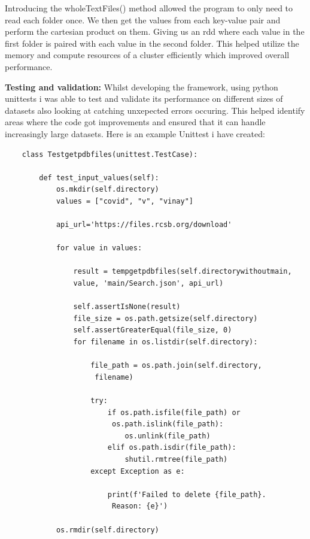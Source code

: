 \documentclass[]{final_report}
\begin{document}
Introducing the wholeTextFiles() method allowed the program to only need to read each folder once. We then get the values from each key-value pair and perform the cartesian product on them. Giving us an rdd where each value in the first folder is paired with each value in the second folder. This helped utilize the memory and compute resources of a cluster efficiently which improved overall performance.

\clearpage

\textbf{Testing and validation:} Whilst developing the framework, using python unittests i was able to test and validate its performance on different sizes of datasets also looking at catching unxepected errors occuring. This helped identify areas where the code got improvements and ensured that it can handle increasingly large datasets. Here is an example Unittest i have created: 

\begin{lstlisting}
    class Testgetpdbfiles(unittest.TestCase):

        def test_input_values(self):
            os.mkdir(self.directory)
            values = ["covid", "v", "vinay"]

            api_url='https://files.rcsb.org/download'

            for value in values:

                result = tempgetpdbfiles(self.directorywithoutmain, 
                value, 'main/Search.json', api_url)

                self.assertIsNone(result)
                file_size = os.path.getsize(self.directory)
                self.assertGreaterEqual(file_size, 0)
                for filename in os.listdir(self.directory):

                    file_path = os.path.join(self.directory,
                     filename)

                    try:
                        if os.path.isfile(file_path) or
                         os.path.islink(file_path):
                            os.unlink(file_path)
                        elif os.path.isdir(file_path):
                            shutil.rmtree(file_path)
                    except Exception as e:

                        print(f'Failed to delete {file_path}.
                         Reason: {e}')

            os.rmdir(self.directory)

\end{lstlisting}
\end{document}

